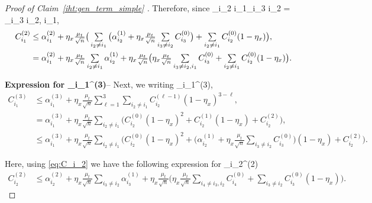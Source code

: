 \documentclass{article}
\def\[#1\]{{$#1$}}
\begin{document}
\begin{proof}[Proof of Claim~\ref{iht:gen_term_simple} ]
	Therefore, since \[\sum\limits_{i_2 \neq i_1}\sum\limits_{i_3 \neq i_2} = \sum\limits_{i_3 \neq i_2, i_1}\],
	\begin{align}\label{eq:C_i_2}
	C_{i_1}^{(2)} 
	&\leq\textstyle \alpha^{(2)}_{i_1}  + \eta_x\tfrac{\mu_t}{\sqrt{n}}\big(\sum\limits_{i_2 \neq i_1} \big(\alpha^{(1)}_{i_2}  +  \eta_x\tfrac{\mu_t}{\sqrt{n}}\textstyle\sum\limits_{i_3 \neq i_2} C_{i_3}^{(0)}\big)+ \textstyle\sum\limits_{i_2 \neq i_1} C_{i_2}^{(0)}(1-\eta_x)\big),\notag\\
	&= \alpha^{(2)}_{i_1}  + \eta_x\tfrac{\mu_t}{\sqrt{n}}\textstyle\sum\limits_{i_2 \neq i_1} \alpha^{(1)}_{i_2}  +  \eta_x\tfrac{\mu_t}{\sqrt{n}}\big(\eta_x\tfrac{\mu_t}{\sqrt{n}}\textstyle\sum\limits_{i_3 \neq i_2, i_1} C_{i_3}^{(0)}+ \textstyle\sum\limits_{i_2 \neq i_1} C_{i_2}^{(0)}(1-\eta_x)\big).
	\end{align}
	
	
	
	
	
	
	
	
	
	
	
	
	
	
	
	
	
	
	
	\noindent\textbf{Expression for \[C_{i_1}^{(3)}\]}-- Next, we writing \[C_{i_1}^{(3)}\],
	\begin{align*}
	C_{i_1}^{(3)} 
	
	
	&\leq \alpha^{(3)}_{i_1}  + \eta_x\tfrac{\mu_t}{\sqrt{n}}\textstyle\sum_{\ell=1}^{3}\textstyle\sum\limits_{i_2 \neq i_1} C_{i_2}^{(\ell -1)}(1-\eta_x)^{3 - \ell},\\
	&= \alpha^{(3)}_{i_1}  + \eta_x\tfrac{\mu_t}{\sqrt{n}} \textstyle\sum\limits_{i_2 \neq i_1}\big(  C_{i_2}^{(0)}(1-\eta_x)^{2} + C_{i_2}^{(1)}(1-\eta_x) +  C_{i_2}^{(2)}\big),\\
	&\leq \alpha^{(3)}_{i_1}  + \eta_x\tfrac{\mu_t}{\sqrt{n}} \textstyle\sum\limits_{i_2 \neq i_1}\big(  C_{i_2}^{(0)}(1-\eta_x)^{2} + \big(\alpha^{(1)}_{i_2}  +  \eta_x\tfrac{\mu_t}{\sqrt{n}}\textstyle\sum\limits_{i_3 \neq i_2} C_{i_3}^{(0)}\big)(1-\eta_x) +  C_{i_2}^{(2)}\big).
	\end{align*}
	
	Here, using \eqref{eq:C_i_2} we have the following expression for \[C_{i_2}^{(2)}\]
	\begin{align*}
	C_{i_2}^{(2)} 
	&\leq \alpha^{(2)}_{i_2}  + \eta_x\tfrac{\mu_t}{\sqrt{n}}\textstyle\sum\limits_{i_3 \neq i_2} \alpha^{(1)}_{i_3}  +  \eta_x\tfrac{\mu_t}{\sqrt{n}}\big(\eta_x\tfrac{\mu_t}{\sqrt{n}}\textstyle\sum\limits_{i_4 \neq i_3, i_2} C_{i_4}^{(0)}+ \textstyle\sum\limits_{i_3 \neq i_2} C_{i_3}^{(0)}(1-\eta_x)\big).
	\end{align*}
	

\end{proof}
\end{document}
